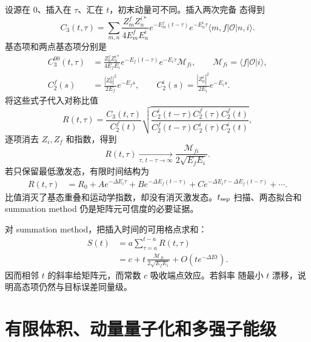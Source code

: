 \documentclass[UTF8,11pt,oneside]{ctexbook}
\begin{document}
设源在 0、插入在 \(\tau\)、汇在 \(t\)，初末动量可不同。插入两次完备
态得到
\begin{equation}
 C_3(t,\tau)=\sum_{m,n}
 \frac{Z_m^f Z_n^{i*}}{4E_m^fE_n^i}
 e^{-E_m^f(t-\tau)}e^{-E_n^i\tau}
 \langle m,f|\mathcal O|n,i\rangle .
 \label{eq:deep-three-point-spectrum}
\end{equation}
基态项和两点基态项分别是
\begin{align}
 C_3^{00}(t,\tau)&=
 \frac{Z_0^fZ_0^{i*}}{4E_fE_i}
 e^{-E_f(t-\tau)}e^{-E_i\tau}\mathcal M_{fi},
 \qquad \mathcal M_{fi}=\langle f|\mathcal O|i\rangle,\\
 C_2^f(s)&=\frac{|Z_0^f|^2}{2E_f}e^{-E_fs},\qquad
 C_2^i(s)=\frac{|Z_0^i|^2}{2E_i}e^{-E_is}.
 \label{eq:deep-two-three-ground}
\end{align}
将这些式子代入对称比值
\begin{equation}
 R(t,\tau)=\frac{C_3(t,\tau)}{C_2^f(t)}
 \sqrt{\frac{C_2^i(t-\tau)C_2^f(\tau)C_2^f(t)}
 {C_2^f(t-\tau)C_2^i(\tau)C_2^i(t)}} ,
 \label{eq:deep-symmetric-ratio}
\end{equation}
逐项消去 \(Z_i,Z_f\) 和指数，得到
\begin{equation}
 R(t,\tau)\xrightarrow[\tau,\,t-\tau\to\infty]{}
 \frac{\mathcal M_{fi}}{2\sqrt{E_fE_i}} .
 \label{eq:deep-ratio-limit}
\end{equation}
若只保留最低激发态，有限时间结构为
\begin{align}
 R(t,\tau)&=R_0+A e^{-\Delta E_i\tau}
 +B e^{-\Delta E_f(t-\tau)}
 +C e^{-\Delta E_i\tau-\Delta E_f(t-\tau)}+\cdots .
 \label{eq:deep-ratio-excited}
\end{align}
比值消灭了基态重叠和运动学指数，却没有消灭激发态。\(t_{\rm sep}\)
扫描、两态拟合和 summation method 仍是矩阵元可信度的必要证据。

对 summation method，把插入时间的可用格点求和：
\begin{align}
 S(t)&=a\sum_{\tau=a}^{t-a}R(t,\tau)\\
 &=c+t\,\frac{\mathcal M_{fi}}{2\sqrt{E_fE_i}}
 +O\left(t e^{-\Delta E t}\right).
 \label{eq:deep-summation-method}
\end{align}
因而相邻 \(t\) 的斜率给矩阵元，而常数 \(c\) 吸收端点效应。若斜率
随最小 \(t\) 漂移，说明高态项仍然与目标误差同量级。

\section{有限体积、动量量子化和多强子能级}
\end{document}
